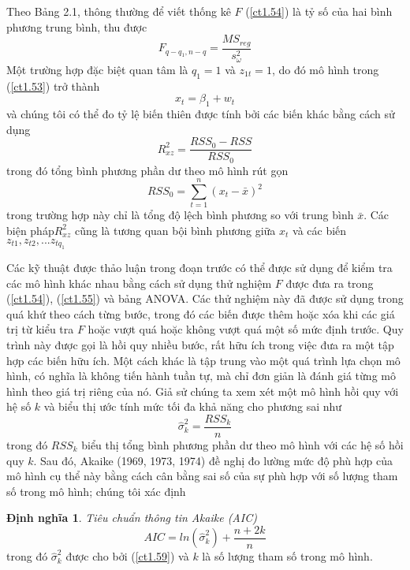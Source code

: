 \documentclass[12pt, a4paper,oneside]{book}
\theoremstyle{definition}
\newtheorem{dn}[theo]{Định nghĩa}
\begin{document}
Theo Bảng 2.1, thông thường để viết thống kê $ F $ (\ref{ct1.54}) là tỷ số của hai bình phương trung bình, thu được
\begin{equation}
F_{q-q_{1}, n-q}=\frac{MS_{reg}}{s_{\omega}^{2}} \label{ct1.55}
\end{equation}
Một trường hợp đặc biệt quan tâm là $ q_{1}=1 $ và $ z_{1t}=1 $, do đó mô hình trong (\ref{ct1.53}) trở thành
\begin{equation}
x_{t}=\beta_{1} + w_{t} \label{ct1.56}
\end{equation}
và chúng tôi có thể đo tỷ lệ biến thiên được tính bởi các biến khác bằng cách sử dụng
\begin{equation}
R_{xz}^{2}=\dfrac{RSS_{0}-RSS}{RSS_{0}} \label{ct1.57}
\end{equation}
trong đó tổng bình phương phần dư theo mô hình rút gọn
\begin{equation}
RSS_{0}= \sum_{t=1}^{n} (x_{t}-\bar{x})^{2} \label{ct1.58}
\end{equation}
trong trường hợp này chỉ là tổng độ lệch bình phương so với trung bình $\bar{x}$. Các biện pháp$ R_{xz}^{2} $ cũng là tương quan bội bình phương giữa $x_{t}$ và các biến $ z_{t1}, z_{t2},...z_{tq_{1}} $

Các kỹ thuật được thảo luận trong đoạn trước có thể được sử dụng để kiểm tra các mô hình khác nhau bằng cách sử dụng thử nghiệm $ F $ được đưa ra trong (\ref{ct1.54}), (\ref{ct1.55}) và bảng ANOVA. Các thử nghiệm này đã được sử dụng trong quá khứ theo cách từng bước, trong đó các biến được thêm hoặc xóa khi các giá trị từ kiểu tra $F$ hoặc vượt quá hoặc không vượt quá một số mức định trước. Quy trình này được gọi là hồi quy nhiều bước, rất hữu ích trong việc đưa ra một tập hợp các biến hữu ích. Một cách khác là tập trung vào một quá trình lựa chọn mô hình, có nghĩa là không tiến hành tuần tự, mà chỉ đơn giản là đánh giá từng mô hình theo giá trị riêng của nó. Giả sử chúng ta xem xét một mô hình hồi quy với hệ số $ k $ và biểu thị ước tính mức tối đa khả năng cho phương sai như	
\begin{equation}
\hat{\sigma}_{k}^{2}=\dfrac{RSS_{k}}{n} \label{ct1.59}
\end{equation}
trong đó $ RSS_{k} $ biểu thị tổng bình phương phần dư theo mô hình với các hệ số hồi quy $ k $. Sau đó, Akaike (1969, 1973, 1974) đề nghị đo lường mức độ phù hợp của mô hình cụ thể này bằng cách cân bằng sai số của sự phù hợp với số lượng tham số trong mô hình; chúng tôi xác định 
\begin{dn}	
	\textit{Tiêu chuẩn thông tin Akaike (AIC)} 
	\begin{equation}
	AIC= ln (\hat{\sigma}_{k}^{2}) +\dfrac{n+ 2k}{n} \label{ct1.60}
	\end{equation}
	trong đó $ \hat{\sigma}_{k}^{2} $ được cho bởi (\ref{ct1.59}) và $ k $ là số lượng tham số trong mô hình.
\end{dn}
\end{document}
